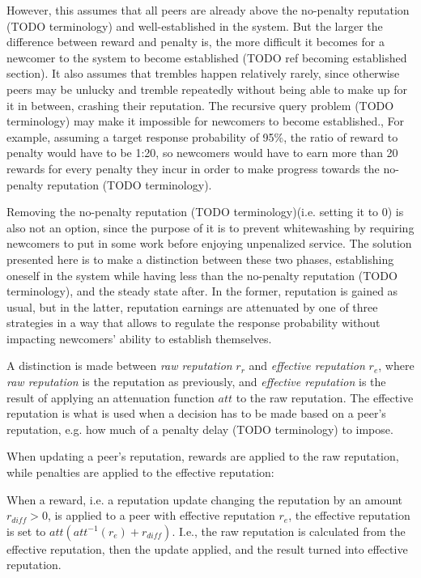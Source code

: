 However, this assumes that all peers are already above the no-penalty reputation
(TODO terminology) and well-established in the system. But the larger the
difference between reward and penalty is, the more difficult it becomes for a
newcomer to the system to become established (TODO ref becoming established
section). It also assumes that trembles happen relatively rarely, since
otherwise peers may be unlucky and tremble repeatedly without being able to make
up for it in between, crashing their reputation. The recursive query problem
(TODO terminology) may make it impossible for newcomers to become established.,
For example, assuming a target response probability of 95\%, the ratio of reward
to penalty would have to be 1:20, so newcomers would have to earn more than 20
rewards for every penalty they incur in order to make progress towards the
no-penalty reputation (TODO terminology).

Removing the no-penalty reputation (TODO terminology)(i.e. setting it to 0) is
also not an option, since the purpose of it is to prevent whitewashing by
requiring newcomers to put in some work before enjoying unpenalized service. The
solution presented here is to make a distinction between these two phases,
establishing oneself in the system while having less than the no-penalty
reputation (TODO terminology), and the steady state after. In the former,
reputation is gained as usual, but in the latter, reputation earnings are
attenuated by one of three strategies in a way that allows to regulate the
response probability without impacting newcomers' ability to establish
themselves.

A distinction is made between \emph{raw reputation} $r_r$ and \emph{effective
reputation} $r_e$, where \emph{raw reputation} is the reputation as previously,
and \emph{effective reputation} is the result of applying an attenuation
function $att$ to the raw reputation. The effective reputation is what is used
when a decision has to be made based on a peer's reputation, e.g. how much of a
penalty delay (TODO terminology) to impose.

When updating a peer's reputation, rewards are applied to the raw reputation,
while penalties are applied to the effective reputation:

When a reward, i.e. a reputation update changing the reputation by an amount
$r_{diff} > 0$, is applied to a peer with effective reputation $r_e$, the
effective reputation is set to $att(att^{-1}(r_e) + r_{diff})$. I.e., the raw
reputation is calculated from the effective reputation, then the update applied,
and the result turned into effective reputation.

